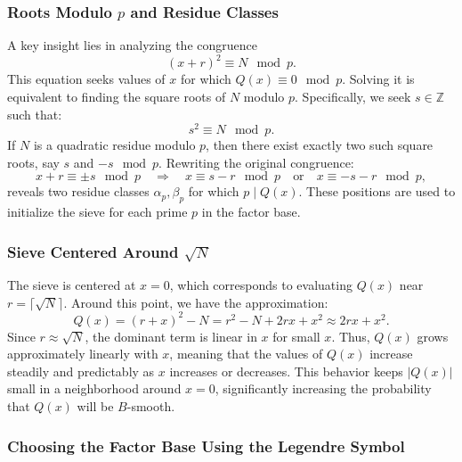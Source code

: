 \documentclass[a4paper, 11pt]{article}
\begin{document}
\subsubsection{Roots Modulo $p$ and Residue Classes}

A key insight lies in analyzing the congruence
\begin{equation}
(x + r)^2 \equiv N \mod p.
\end{equation}
This equation seeks values of $x$ for which $Q(x) \equiv 0 \mod p$. Solving it is equivalent to finding the square roots of $N$ modulo $p$. Specifically, we seek $s \in \mathbb{Z}$ such that:
\begin{equation}
s^2 \equiv N \mod p.
\end{equation}
If $N$ is a quadratic residue modulo $p$, then there exist exactly two such square roots, say $s$ and $-s \mod p$. Rewriting the original congruence:
\begin{equation}
x + r \equiv \pm s \mod p \quad \Longrightarrow \quad
x \equiv s - r \mod p \quad \text{or} \quad x \equiv -s - r \mod p,
\end{equation}
reveals two residue classes $\alpha_p, \beta_p$ for which $p \mid Q(x)$. These positions are used to initialize the sieve for each prime $p$ in the factor base.

\subsubsection{Sieve Centered Around $\sqrt{N}$}

The sieve is centered at $x = 0$, which corresponds to evaluating $Q(x)$ near $r = \lceil \sqrt{N} \rceil$. Around this point, we have the approximation:
\begin{equation}
Q(x) = (r + x)^2 - N = r^2 - N + 2rx + x^2 \approx 2rx + x^2.
\end{equation}
Since $r \approx \sqrt{N}$, the dominant term is linear in $x$ for small $x$. Thus, $Q(x)$ grows approximately linearly with $x$, meaning that the values of $Q(x)$ increase steadily and predictably as $x$ increases or decreases. This behavior keeps $|Q(x)|$ small in a neighborhood around $x = 0$, significantly increasing the probability that $Q(x)$ will be $B$-smooth.

\subsubsection{Choosing the Factor Base Using the Legendre Symbol}
\end{document}
